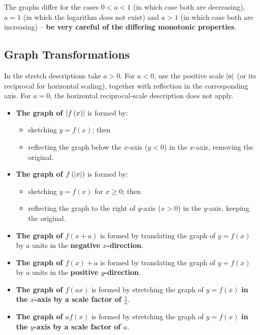 \documentclass[11pt]{article}
\theoremstyle{definition}
\theoremstyle{remark}
\newcommand{\pqty}[1]{\left(#1\right)}
\DeclarePairedDelimiter{\abs}{\lvert}{\rvert}
\newcommand{\flatfrac}[2]{\frac{#1}{#2}}
\begin{document}
The graphs differ for the cases \(0 < a < 1\) (in which case both are decreasing), \(a = 1\) (in which the logarithm does not exist) and \(a > 1\) (in which case both are increasing) -- \textbf{be very careful of the differing monotonic properties}.

\subsection{Graph Transformations}\label{tmua-5-subsection-004}
In the stretch descriptions take \(a>0\). For \(a<0\), use the positive scale \(\abs{a}\) (or its reciprocal for horizontal scaling), together with reflection in the corresponding axis. For \(a=0\), the horizontal reciprocal-scale description does not apply.

\begin{itemize}
    \item \textbf{The graph of \(\abs{f\pqty{x}}\)} is formed by:
        \begin{itemize}
            \item sketching \(y = f\pqty{x}\); then
            \item reflecting the graph below the \(x\)-axis (\(y < 0\)) in the \(x\)-axis, removing the original.
        \end{itemize}

    \item \textbf{The graph of \(f\pqty{\abs{x}}\)} is formed by:
        \begin{itemize}
            \item sketching \(y = f\pqty{x}\) for \(x \geq 0\); then
            \item reflecting the graph to the right of \(y\)-axis (\(x > 0\)) in the \(y\)-axis, keeping the original.
        \end{itemize}

    \item \textbf{The graph of \(f\pqty{x + a}\)} is formed by translating the graph of \(y = f\pqty{x}\) by \(a\) units in the \textbf{negative \(x\)-direction}.
    \item \textbf{The graph of \(f\pqty{x} + a\)} is formed by translating the graph of \(y = f\pqty{x}\) by \(a\) units in the \textbf{positive \(y\)-direction}.
    \item \textbf{The graph of \(f\pqty{ax}\)} is formed by stretching the graph of \(y = f\pqty{x}\) \textbf{in the \(x\)-axis by a scale factor of \(\flatfrac{1}{a}\)}.
    \item \textbf{The graph of \(a f\pqty{x}\)} is formed by stretching the graph of \(y = f\pqty{x}\) \textbf{in the \(y\)-axis by a scale factor of \(a\)}.
        
\end{itemize}
\end{document}
